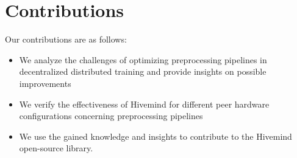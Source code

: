 \section{Contributions}

Our contributions are as follows:
\begin{itemize}
    \item We analyze the challenges of optimizing preprocessing pipelines in decentralized distributed training and provide insights on possible improvements
    \item We verify the effectiveness of Hivemind for different peer hardware configurations concerning preprocessing pipelines
    \item We use the gained knowledge and insights to contribute to the Hivemind open-source library.
\end{itemize}
